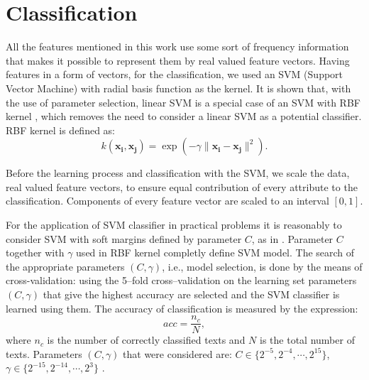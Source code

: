 \documentclass{llncs}
\begin{document}
\section{Classification}
All the features mentioned in this work use some sort of frequency information
that makes it possible to represent them by real valued feature vectors. Having
features in a form of vectors, for the classification, we used an SVM (Support
Vector Machine) with radial basis function as the kernel. It is shown that, with
the use of parameter selection, linear SVM is a special case of an SVM with RBF
kernel \cite{keerthi2003asymptotic}, which removes the need to consider a linear
SVM as a potential classifier. RBF kernel is defined as:
\begin{equation}
k(\mathbf{x_i},\mathbf{x_j})=\exp(-\gamma \|\mathbf{x_i} - \mathbf{x_j}\|^2).
\end{equation}

Before the learning process and classification with the SVM, we scale the data,
real valued feature vectors, to ensure equal contribution of every attribute to
the classification. Components of every feature vector are scaled to an interval
$[0, 1]$.

For the application of SVM classifier in practical problems it is reasonably to
consider SVM with soft margins defined by parameter $C$, as in 
\cite{cortes1995support}. Parameter $C$ together with $\gamma$ used in RBF
kernel completly define SVM model. The search of the appropriate parameters
$(C, \gamma)$, i.e., model selection, is done by the means of cross-validation:
using the 5--fold cross--validation on the learning set parameters $(C, \gamma)$ that give the highest accuracy are selected and the SVM classifier is learned using them. The accuracy of classification is measured by the expression:
\begin{equation}
acc = \frac{n_c}{N}, %
\end{equation}
where $n_c$ is the number of correctly classified texts and $N$ is the total number of
texts.
Parameters $(C, \gamma)$ that were considered are: $C \in \{2^{-5}, 2^{-4},
\cdots , 2^{15}\}$, $\gamma \in \{2^{-15}, 2^{-14}, \cdots, 2^3\}$ \cite{CC01a}.
\end{document}
